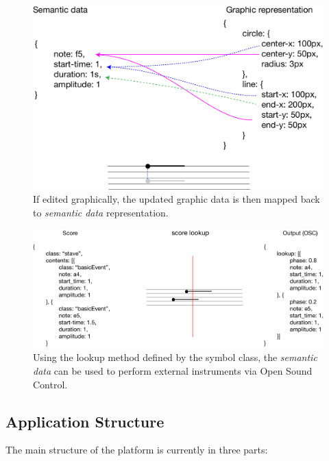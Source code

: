 \documentclass{article}
\begin{document}
\begin{figure}[ht!]
\includegraphics[width=1\columnwidth]{graphic-to-data.pdf}
\caption{If edited graphically, the updated graphic data is then mapped back to \textit{semantic data} representation. 
\label{fig:graphic-to-data}}
\end{figure}


\begin{figure}[ht!]
\includegraphics[width=1\columnwidth]{score-lookup.pdf}
\caption{Using the lookup method defined by the symbol class, the \textit{semantic data} can be used to perform external instruments via Open Sound Control. 
\label{fig:score-lookup}}
\end{figure}


\subsection{Application Structure}\label{subsec:application_structure}

The main structure of the platform is currently in three parts:
\end{document}
